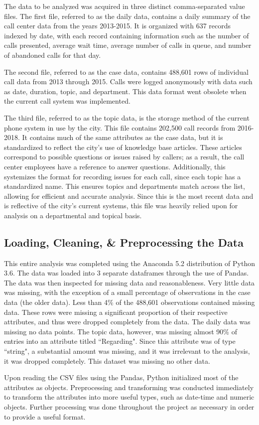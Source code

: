 \documentclass{article}
\begin{document}
The data to be analyzed was acquired in three distinct comma-separated value files.  The first file, referred to as the daily data, contains a daily summary of the call center data from the years 2013-2015.  It is organized with 637 records indexed by date, with each record containing information such as the number of calls presented, average wait time, average number of calls in queue, and number of abandoned calls for that day.
\par
The second file, referred to as the case data, contains 488,601 rows of individual call data from 2013 through 2015.  Calls were logged anonymously with data such as date, duration, topic, and department.  This data format went obsolete when the current call system was implemented.
\par
The third file, referred to as the topic data, is the storage method of the current phone system in use by the city.  This file contains 202,500 call records from 2016-2018.  It contains much of the same attributes as the case data, but it is standardized to reflect the city's use of knowledge base articles.  These articles correspond to possible questions or issues raised by callers; as a result, the call center employees have a reference to answer questions.  Additionally, this systemizes the format for recording issues for each call, since each topic has a standardized name.  This ensures topics and departments match across the list, allowing for efficient and accurate analysis.  Since this is the most recent data and is reflective of the city's current systems, this file was heavily relied upon for analysis on a departmental and topical basis.

	\subsection{Loading, Cleaning, \& Preprocessing the Data}

This entire analysis was completed using the Anaconda 5.2 distribution of Python 3.6.  The data was loaded into 3 separate dataframes through the use of Pandas.  The data was then inspected for missing data and reasonableness.  Very little data was missing, with the exception of a small percentage of observations in the case data (the older data).  Less than 4\% of the 488,601 observations contained missing data.  These rows were missing a significant proportion of their respective attributes, and thus were dropped completely from the data.  The daily data was missing no data points.  The topic data, however, was missing almost 90\% of entries into an attribute titled ``Regarding".  Since this attribute was of type ``string", a substantial amount was missing, and it was irrelevant to the analysis, it was dropped completely.  This dataset was missing no other data.
\par
Upon reading the CSV files using the Pandas, Python initialized most of the attributes as objects.  Preprocessing and transforming was conducted immediately to transform the attributes into more useful types, such as date-time and numeric objects.  Further processing was done throughout the project as necessary in order to provide a useful format.
\end{document}
